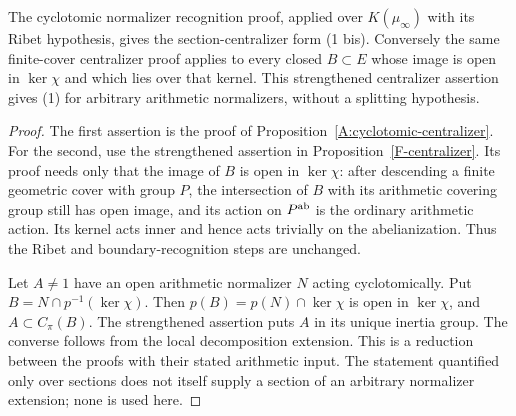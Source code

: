 \begin{proposition}
\label{A:normalizer-implications}
The cyclotomic normalizer recognition proof, applied over
$K(\mu_\infty)$ with its Ribet hypothesis, gives the
section-centralizer form (1 bis).  Conversely the same
finite-cover centralizer proof applies to every closed
$B\subset E$ whose image is open in $\ker\chi$ and
which lies over that kernel.  This strengthened
centralizer assertion gives (1) for arbitrary arithmetic
normalizers, without a splitting hypothesis.
\end{proposition}
\begin{proof}
The first assertion is the proof of
Proposition~\ref{A:cyclotomic-centralizer}.  For the
second, use the strengthened assertion in
Proposition~\ref{F-centralizer}.  Its proof needs only
that the image of $B$ is open in $\ker\chi$: after
descending a finite geometric cover with group $P$, the
intersection of $B$ with its arithmetic covering group
still has open image, and its action on $P^{\rm ab}$
is the ordinary arithmetic action.  Its kernel acts
inner and hence acts trivially on the abelianization.
Thus the Ribet and boundary-recognition steps are
unchanged.

Let $A\ne1$ have an open arithmetic normalizer $N$
acting cyclotomically.  Put $B=N\cap p^{-1}(\ker\chi)$.
Then $p(B)=p(N)\cap\ker\chi$ is open in $\ker\chi$,
and $A\subset C_\pi(B)$.  The strengthened assertion
puts $A$ in its unique inertia group.  The converse
follows from the local decomposition extension.
This is a reduction between the proofs with their stated
arithmetic input.  The statement quantified only over
sections does not itself supply a section of an arbitrary
normalizer extension; none is used here.
\end{proof}

